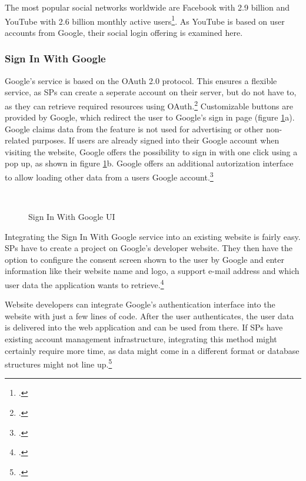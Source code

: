 The most popular social networks worldwide are Facebook with 2.9 billion and YouTube with 2.6 billion monthly 
active users\footcite[Cp.][]{StatistaSocial2022}.
As YouTube is based on user accounts from Google, their social login offering is examined here.

\subsubsection{Sign In With Google}
\label{sec:sign_in_with_google}

Google's service is based on the OAuth 2.0 protocol. This ensures a flexible service,
as \acp{SP} can create a seperate account on their server, but do not have to, as they can retrieve
required resources using OAuth.\footcite[Cp.][]{GoogleSignIn2022}
Customizable buttons are provided by Google, which redirect the user to Google's sign in page (figure \ref{fig:google_sign_in_ui}a).
Google claims data from the feature is not used for advertising or other non-related purposes.
If users are already signed into their Google account when visiting the website, Google offers the
possibility to sign in with one click using a pop up, as shown in figure \ref{fig:google_sign_in_ui}b.
Google offers an additional autorization interface to allow loading other data from a users Google account.\footcite[Cp.][]{GoogleSignIn2022}

\begin{figure}[H]
    \caption{Sign In With Google UI}%
    \centering
    \hfill
    \hfill
    \\
    \cite[Source:][]{GoogleSignIn2022}
    \label{fig:google_sign_in_ui}%
\end{figure}

Integrating the Sign In With Google service into an existing website is fairly easy.
\acp{SP} have to create a project on Google's developer website. They then have the option
to configure the consent screen shown to the user by Google and enter information like their website name and logo,
a support e-mail address and which user data the application wants to retrieve.\footcite[Cp.][]{GoogleSignIn2022}

Website developers can integrate Google's authentication interface into the website with just a few lines of code.
After the user authenticates, the user data is delivered into the web application and can be used from there.
If \acp{SP} have existing account management infrastructure, integrating this method might certainly require
more time, as data might come in a different format or database structures might not line up.\footcite[Cp.][]{GoogleSignIn2022}
